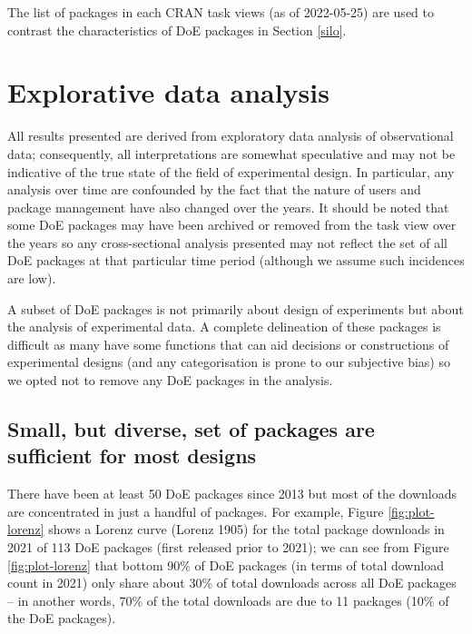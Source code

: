 \documentclass{article}
\begin{document}
The list of packages in each CRAN task views (as of 2022-05-25) are used
to contrast the characteristics of DoE packages in Section \ref{silo}.

\hypertarget{eda}{%
\section{Explorative data analysis}\label{eda}}

All results presented are derived from exploratory data analysis of
observational data; consequently, all interpretations are somewhat
speculative and may not be indicative of the true state of the field of
experimental design. In particular, any analysis over time are
confounded by the fact that the nature of users and package management
have also changed over the years. It should be noted that some DoE
packages may have been archived or removed from the task view over the
years so any cross-sectional analysis presented may not reflect the set
of all DoE packages at that particular time period (although we assume
such incidences are low).

A subset of DoE packages is not primarily about design of experiments
but about the analysis of experimental data. A complete delineation of
these packages is difficult as many have some functions that can aid
decisions or constructions of experimental designs (and any
categorisation is prone to our subjective bias) so we opted not to
remove any DoE packages in the analysis.

\hypertarget{popular}{%
\subsection{Small, but diverse, set of packages are sufficient for most
designs}\label{popular}}

There have been at least 50 DoE packages since 2013 but most of the
downloads are concentrated in just a handful of packages. For example,
Figure \ref{fig:plot-lorenz} shows a Lorenz curve (Lorenz 1905) for the
total package downloads in 2021 of 113 DoE packages (first released
prior to 2021); we can see from Figure \ref{fig:plot-lorenz} that bottom
90\% of DoE packages (in terms of total download count in 2021) only
share about 30\% of total downloads across all DoE packages -- in
another words, 70\% of the total downloads are due to 11 packages (10\%
of the DoE packages).
\end{document}
